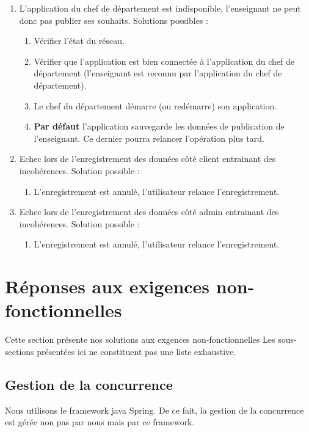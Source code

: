     \begin{enumerate}
        \item L'application du chef de département est indisponible, l'enseignant ne peut donc pas publier ses souhaits. Solutions possibles :
        \begin{enumerate}
            \item Vérifier l'état du réseau.
            \item Vérifier que l'application est bien connectée à l'application du chef de département (l'enseignant est reconnu par l'application du chef de département).
            \item Le chef du département démarre (ou redémarre) son application. 
            \item \textbf{Par défaut} l'application sauvegarde les données de publication de l'enseignant. Ce dernier pourra relancer l'opération plus tard.
        \end{enumerate}
        \item Echec lors de l'enregistrement des données côté client entrainant des incohérences. Solution possible :
        \begin{enumerate}
            \item L'enregistrement est annulé, l'utilisateur relance l'enregistrement.
        \end{enumerate}
        \item Echec lors de l'enregistrement des données côté admin entrainant des incohérences. Solution possible : 
        \begin{enumerate}
            \item L'enregistrement est annulé, l'utilisateur relance l'enregistrement.
        \end{enumerate}
    \end{enumerate}

\section{Réponses aux exigences non-fonctionnelles}
    Cette section présente nos solutions aux exgences non-fonctionnelles
    Les sous-sections présentées ici ne constituent pas une liste exhaustive.

    \subsection{Gestion de la concurrence}
    Nous utilisons le framework java Spring. De ce fait, la gestion de la concurrence est gérée non pas par nous mais par ce framework.
    
